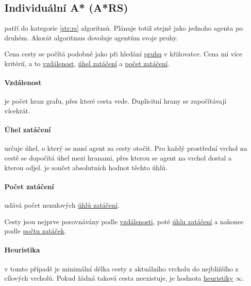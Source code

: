 \subsection{Individuální A* (A*RS)}\label{subsec:individualni_a_star}


 patří do kategorie \ref{str:rs} algoritmů.
Plánuje totiž stejně jako  jednoho agenta po druhém.
Akorát algoritmus dovoluje agentům  svoje pruhy.

Cena cesty se počítá podobně jako při hledání \hyperref[par:pruh]{pruhu} v křižovatce.
Cena mí více kritérií, a to \hyperref[par:ars_vzdalenost]{vzdálenost},
\hyperref[par:ars_uhel_zataceni]{úhel zatáčení} a \hyperref[par:ars_pocet_zataceni]{počet zatáčení}.

\paragraph{Vzdálenost}\label{par:ars_vzdalenost} je počet hran grafu, přes které cesta vede.
Duplicitní hrany se započítávají vícekrát.

\paragraph{Úhel zatáčení}\label{par:ars_uhel_zataceni} určuje úhel, o který se musí agent za cesty otočit.
Pro každý prostřední vrchol na cestě se dopočítá úhel mezi hranami,
přes kterou se agent na vrchol dostal a kterou odjel.
 je součet absolutních hodnot těchto úhlů.

\paragraph{Počet zatáčení}\label{par:ars_pocet_zataceni} udává počet
nenulových \hyperref[par:ars_uhel_zataceni]{úhlů zatáčení}.

Cesty jsou nejprve porovnávány podle \hyperref[par:ars_vzdalenost]{vzdálenosti},
poté \hyperref[par:ars_uhel_zataceni]{úhlu zatáčení} a nakonec podle \hyperref[par:ars_pocet_zataceni]{počtu zatáček}.

\paragraph{Heuristika}\label{par:ars_heuristika} v tomto případě je minimální délka cesty
z aktuálního vrcholu do nejbližšího z cílových vrcholů.
Pokud žádná taková cesta neexistuje, je hodnota \hyperref[par:ars_heuristika]{heuristiky} $\infty$.

